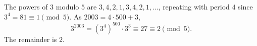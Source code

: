 The powers of $3$ modulo $5$ are $3,4,2,1,3,4,2,1,\dots$, repeating with period $4$ since $3^4=81\equiv1\pmod5$. As $2003=4\cdot500+3$,
\[
3^{2003}=(3^4)^{500}\cdot3^3\equiv27\equiv2\pmod5 .
\]
The remainder is $\boxed{2}$.
